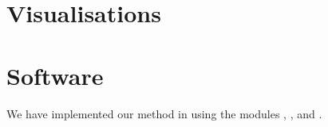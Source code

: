 \chapter{Visualisations}
\label{sec:visualisations}


\chapter{Software}
\label{cha:software}

We have implemented our method in \Python using the modules \Theano, \Lasagne, and \Parmesan.
